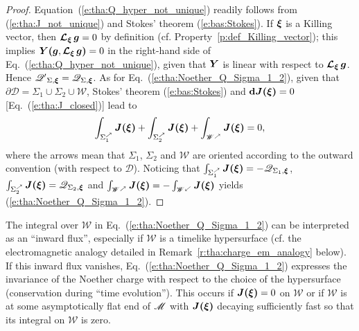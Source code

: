 \begin{proof}
Equation~(\ref{e:tha:Q_hyper_not_unique}) readily follows from (\ref{e:tha:J_not_unique}) and
Stokes' theorem (\ref{e:bas:Stokes}). If $\bm{\xi}$ is a Killing vector, then
$\bm{\mathcal{L}}_{\bm{\xi}}\,\bm{g}= 0$ by definition (cf. Property~\ref{p:def_Killing_vector}); this implies
$\bm{Y}\textbf{(}\bm{g},\bm{\mathcal{L}}_{\bm{\xi}}\,\bm{g}\textbf{)} = 0$ in the
right-hand side of Eq.~(\ref{e:tha:Q_hyper_not_unique}), given that
$\bm{Y}$ is linear with respect to $\bm{\mathcal{L}}_{\bm{\xi}}\,\bm{g}$. Hence
$\mathscr{Q'}_{\Sigma,\bm{\xi}} = \mathscr{Q}_{\Sigma,\bm{\xi}}$.
As for Eq.~(\ref{e:tha:Noether_Q_Sigma_1_2}),
given that $\partial\mathscr{D} = \Sigma_1\cup\Sigma_2\cup\mathscr{W}$, Stokes' theorem (\ref{e:bas:Stokes})
and $\mathbf{d} \bm{J}\textbf{(}\bm{\xi}\textbf{)} = 0$ [Eq.~(\ref{e:tha:J_closed})] lead to
\[
     \int_{\Sigma_1^{\nearrow}} \bm{J}\textbf{(}\bm{\xi}\textbf{)} + \int_{\Sigma_2^{\nearrow}} \bm{J}\textbf{(}\bm{\xi}\textbf{)}
      + \int_{\mathscr{W}^{\nearrow}} \bm{J}\textbf{(}\bm{\xi}\textbf{)} = 0 ,
\]
where the arrows mean that $\Sigma_1$, $\Sigma_2$ and $\mathscr{W}$ are oriented according to the outward
convention (with respect to $\mathscr{D}$).
Noticing that $\int_{\Sigma_1^{\nearrow}} \bm{J}\textbf{(}\bm{\xi}\textbf{)} = -\mathscr{Q}_{\Sigma_1,\bm{\xi}}$,
$\int_{\Sigma_2^{\nearrow}} \bm{J}\textbf{(}\bm{\xi}\textbf{)} = \mathscr{Q}_{\Sigma_2,\bm{\xi}}$
and $\int_{\mathscr{W}^{\nearrow}} \bm{J}\textbf{(}\bm{\xi}\textbf{)} = - \int_{\mathscr{W}^{\swarrow}} \bm{J}\textbf{(}\bm{\xi}\textbf{)}$
yields (\ref{e:tha:Noether_Q_Sigma_1_2}).
\end{proof}

The integral over $\mathscr{W}$ in Eq.~(\ref{e:tha:Noether_Q_Sigma_1_2}) can be interpreted as
an ``inward flux'', especially if $\mathscr{W}$ is a timelike hypersurface
(cf. the electromagnetic analogy detailed in Remark~\ref{r:tha:charge_em_analogy} below).
If this inward flux vanishes,
Eq.~(\ref{e:tha:Noether_Q_Sigma_1_2}) expresses the
invariance of the Noether charge with respect to the choice of the hypersurface
(conservation during ``time evolution''). This occurs
if $\bm{J}\textbf{(}\bm{\xi}\textbf{)} = 0$ on $\mathscr{W}$ or if  $\mathscr{W}$ is at some asymptotically flat end
of $\mathscr{M}$ with $\bm{J}\textbf{(}\bm{\xi}\textbf{)}$ decaying sufficiently fast so that its integral on $\mathscr{W}$ is zero.

